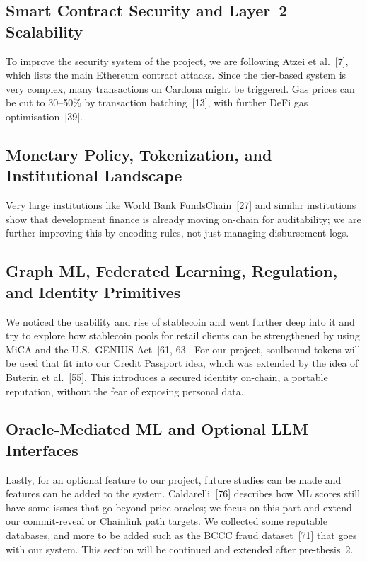 \documentclass[12pt, a4paper]{report}
\begin{document}
\subsection{Smart Contract Security and Layer~2 Scalability}

To improve the security system of the project, we are following Atzei et al.~[7], which lists the main Ethereum contract attacks. Since the tier-based system is very complex, many transactions on Cardona might be triggered. Gas prices can be cut to 30--50\% by transaction batching~[13], with further DeFi gas optimisation~[39].

\subsection{Monetary Policy, Tokenization, and Institutional Landscape}
\label{sec:lit-institutional}

Very large institutions like World Bank FundsChain~[27] and similar institutions show that development finance is already moving on-chain for auditability; we are further improving this by encoding rules, not just managing disbursement logs.

\subsection{Graph ML, Federated Learning, Regulation, and Identity Primitives}

We noticed the usability and rise of stablecoin and went further deep into it and try to explore how stablecoin pools for retail clients can be strengthened by using MiCA and the U.S.\ GENIUS Act~[61, 63]. For our project, soulbound tokens will be used that fit into our Credit Passport idea, which was extended by the idea of Buterin et al.~[55]. This introduces a secured identity on-chain, a portable reputation, without the fear of exposing personal data.

\subsection{Oracle-Mediated ML and Optional LLM Interfaces}
\label{sec:lit-llm}

Lastly, for an optional feature to our project, future studies can be made and features can be added to the system. Caldarelli~[76] describes how ML scores still have some issues that go beyond price oracles; we focus on this part and extend our commit-reveal or Chainlink path targets. We collected some reputable databases, and more to be added such as the BCCC fraud dataset~[71] that goes with our system. This section will be continued and extended after pre-thesis~2.
\end{document}
